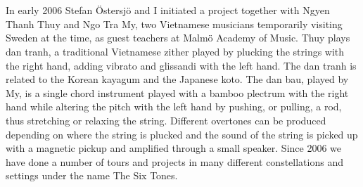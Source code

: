 \documentclass[a4paper]{article}
\begin{document}
\section*{ }
\label{sec:tu-dai-oan}

In early 2006 Stefan Östersjö and I initiated a project together with Ngyen Thanh Thuy and Ngo Tra My, two Vietnamese musicians temporarily visiting Sweden at the time, as guest teachers at Malmö Academy of Music. Thuy plays dan tranh, a traditional Vietnamese zither played by plucking the strings with the right hand, adding vibrato and glissandi with the left hand. The dan tranh is related to the Korean kayagum and the Japanese koto. The dan bau, played by My, is a single chord instrument played with a bamboo plectrum with the right hand while altering the pitch with the left hand by pushing, or pulling, a rod, thus stretching or relaxing the string. Different overtones can be produced depending on where the string is plucked and the sound of the string is picked up with a magnetic pickup and amplified through a small speaker. Since 2006 we have done a number of tours and projects in many different constellations and settings under the name The Six Tones.
\end{document}
